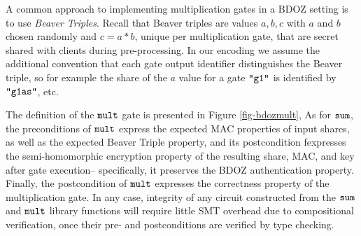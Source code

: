 A common approach to implementing multiplication gates in a BDOZ
setting is to use \emph{Beaver Triples}. Recall that Beaver triples
are values $a,b,c$ with $a$ and $b$ chosen randomly and $c = a * b$,
unique per multiplication gate, that are secret shared with clients
during pre-processing.  In our encoding we assume the additional
convention that each gate output identifier distinguishes the Beaver
triple, so for example the share of the $a$ value for a gate
$\texttt{"g1"}$ is identified by $\texttt{"g1as"}$, etc.


The definition of the $\texttt{mult}$ gate is presented in Figure
\ref{fig-bdozmult},
%
As for $\texttt{sum}$, the preconditions of $\texttt{mult}$ express
the expected MAC properties of input shares, as well as the
expected Beaver Triple property, and its postcondition
fexpresses the semi-homomorphic encryption property of
the resulting share, MAC, and key after gate execution-- specifically,
it preserves the BDOZ authentication property. Finally, the
postcondition of $\texttt{mult}$ expresses the
correctness property of the multiplication gate. In any case,
integrity of any circuit constructed from the $\texttt{sum}$ and
$\texttt{mult}$ library functions will require little SMT overhead
due to compositional verification, once their pre- and postconditions
are verified by type checking. 

